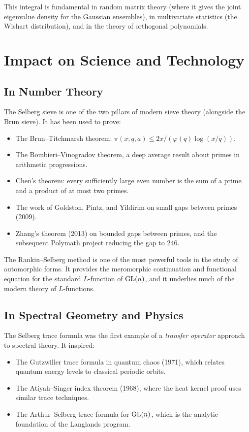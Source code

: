 This integral is fundamental in random matrix theory (where it gives the joint eigenvalue density for the Gaussian ensembles), in multivariate statistics (the Wishart distribution), and in the theory of orthogonal polynomials.

\section{Impact on Science and Technology}

\subsection{In Number Theory}

The Selberg sieve is one of the two pillars of modern sieve theory (alongside the Brun sieve). It has been used to prove:
\begin{itemize}
    \item The Brun--Titchmarsh theorem: \(\pi(x; q,a) \leq 2x/(\varphi(q) \log(x/q))\).
    \item The Bombieri--Vinogradov theorem, a deep average result about primes in arithmetic progressions.
    \item Chen's theorem: every sufficiently large even number is the sum of a prime and a product of at most two primes.
    \item The work of Goldston, Pintz, and Yildirim on small gaps between primes (2009).
    \item Zhang's theorem (2013) on bounded gaps between primes, and the subsequent Polymath project reducing the gap to 246.
\end{itemize}

The Rankin--Selberg method is one of the most powerful tools in the study of automorphic forms. It provides the meromorphic continuation and functional equation for the standard \(L\)-function of \(\operatorname{GL}(n)\), and it underlies much of the modern theory of \(L\)-functions.

\subsection{In Spectral Geometry and Physics}

The Selberg trace formula was the first example of a \emph{transfer operator} approach to spectral theory. It inspired:
\begin{itemize}
    \item The Gutzwiller trace formula in quantum chaos (1971), which relates quantum energy levels to classical periodic orbits.
    \item The Atiyah--Singer index theorem (1968), where the heat kernel proof uses similar trace techniques.
    \item The Arthur--Selberg trace formula for \(\operatorname{GL}(n)\), which is the analytic foundation of the Langlands program.
\end{itemize}

